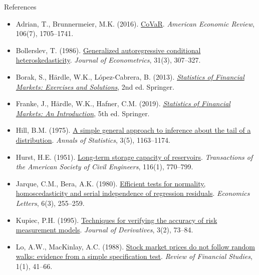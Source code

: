 \begin{frame}{References}
\itemsize{\tiny}
\begin{itemize}
    \item Adrian, T., Brunnermeier, M.K. (2016). \href{https://doi.org/10.1257/aer.20120555}{CoVaR}. \textit{American Economic Review}, 106(7), 1705--1741.
    \item Bollerslev, T. (1986). \href{https://doi.org/10.1016/0304-4076(86)90063-1}{Generalized autoregressive conditional heteroskedasticity}. \textit{Journal of Econometrics}, 31(3), 307--327.
    \item Borak, S., Härdle, W.K., López-Cabrera, B. (2013). \href{https://doi.org/10.1007/978-3-642-33929-5}{\textit{Statistics of Financial Markets: Exercises and Solutions}}, 2nd ed. Springer.
    \item Franke, J., Härdle, W.K., Hafner, C.M. (2019). \href{https://doi.org/10.1007/978-3-030-13751-9}{\textit{Statistics of Financial Markets: An Introduction}}, 5th ed. Springer.
    \item Hill, B.M. (1975). \href{https://doi.org/10.1214/aos/1176343247}{A simple general approach to inference about the tail of a distribution}. \textit{Annals of Statistics}, 3(5), 1163--1174.
    \item Hurst, H.E. (1951). \href{https://doi.org/10.1061/TACEAT.0006518}{Long-term storage capacity of reservoirs}. \textit{Transactions of the American Society of Civil Engineers}, 116(1), 770--799.
    \item Jarque, C.M., Bera, A.K. (1980). \href{https://doi.org/10.1016/0165-1765(80)90024-5}{Efficient tests for normality, homoscedasticity and serial independence of regression residuals}. \textit{Economics Letters}, 6(3), 255--259.
    \item Kupiec, P.H. (1995). \href{https://doi.org/10.3905/jod.1995.407942}{Techniques for verifying the accuracy of risk measurement models}. \textit{Journal of Derivatives}, 3(2), 73--84.
    \item Lo, A.W., MacKinlay, A.C. (1988). \href{https://doi.org/10.1093/rfs/1.1.41}{Stock market prices do not follow random walks: evidence from a simple specification test}. \textit{Review of Financial Studies}, 1(1), 41--66.
\end{itemize}
\end{frame}


